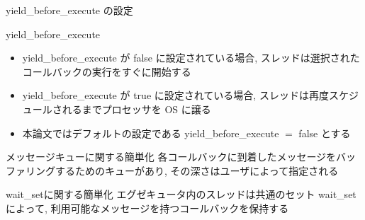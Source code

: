 \begin{frame}{yield\_before\_execute の設定}
    \begin{block}{yield\_before\_execute}
    \setlength{\linewidth}{0.98\columnwidth}
    \begin{itemize}
        \item yield\_before\_execute が false に設定されている場合, スレッドは選択されたコールバックの実行をすぐに開始する
        \item yield\_before\_execute が true に設定されている場合, スレッドは再度スケジュールされるまでプロセッサを OS に譲る
    \end{itemize}
    \end{block}
    \vspace{5mm}
    \begin{itemize}
        \item 本論文ではデフォルトの設定である yield\_before\_execute $=$ false とする
    \end{itemize}
\end{frame}

\begin{frame}{メッセージキューに関する簡単化}
    各コールバックに到着したメッセージをバッファリングするためのキューがあり, その深さはユーザによって指定される
\end{frame}

\begin{frame}{wait\_setに関する簡単化}
    エグゼキュータ内のスレッドは共通のセット wait\_set によって, 利用可能なメッセージを持つコールバックを保持する
\end{frame}
